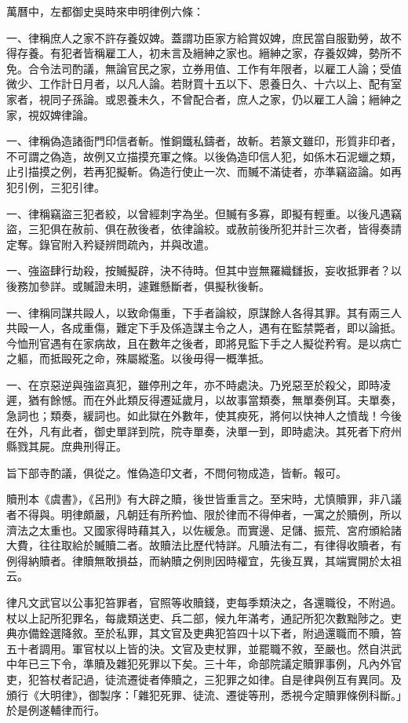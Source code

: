 萬曆中，左都御史吳時來申明律例六條：

一、律稱庶人之家不許存養奴婢。蓋謂功臣家方給賞奴婢，庶民當自服勤勞，故不得存養。有犯者皆稱雇工人，初未言及縉紳之家也。縉紳之家，存養奴婢，勢所不免。合令法司酌議，無論官民之家，立券用值、工作有年限者，以雇工人論；受值微少、工作計日月者，以凡人論。若財買十五以下、恩養日久、十六以上、配有室家者，視同子孫論。或恩養未久，不曾配合者，庶人之家，仍以雇工人論；縉紳之家，視奴婢律論。

一、律稱偽造諸衙門印信者斬。惟銅鐵私鑄者，故斬。若篆文雖印，形質非印者，不可謂之偽造，故例又立描摸充軍之條。以後偽造印信人犯，如係木石泥蠟之類，止引描摸之例，若再犯擬斬。偽造行使止一次、而贓不滿徒者，亦準竊盜論。如再犯引例，三犯引律。

一、律稱竊盜三犯者絞，以曾經刺字為坐。但贓有多寡，即擬有輕重。以後凡遇竊盜，三犯俱在赦前、俱在赦後者，依律論絞。或赦前後所犯并計三次者，皆得奏請定奪。錄官附入矜疑辨問疏內，并與改遣。

一、強盜肆行劫殺，按贓擬辟，決不待時。但其中豈無羅織讎扳，妄收抵罪者？以後務加參詳。或贓證未明，遽難懸斷者，俱擬秋後斬。

一、律稱同謀共毆人，以致命傷重，下手者論絞，原謀餘人各得其罪。其有兩三人共毆一人，各成重傷，難定下手及係造謀主令之人，遇有在監禁斃者，即以論抵。今恤刑官遇有在家病故，且在數年之後者，即將見監下手之人擬從矜宥。是以病亡之軀，而抵毆死之命，殊屬縱濫。以後毋得一概準抵。

一、在京惡逆與強盜真犯，雖停刑之年，亦不時處決。乃兇惡至於殺父，即時凌遲，猶有餘憾。而在外此類反得遷延歲月，以故事當類奏，無單奏例耳。夫單奏，急詞也；類奏，緩詞也。如此獄在外數年，使其瘐死，將何以快神人之憤哉！今後在外，凡有此者，御史單詳到院，院寺單奏，決單一到，即時處決。其死者下府州縣戮其屍。庶典刑得正。

旨下部寺酌議，俱從之。惟偽造印文者，不問何物成造，皆斬。報可。

贖刑本《虞書》，《呂刑》有大辟之贖，後世皆重言之。至宋時，尤慎贖罪，非八議者不得與。明律頗嚴，凡朝廷有所矜恤、限於律而不得伸者，一寓之於贖例，所以濟法之太重也。又國家得時藉其入，以佐緩急。而實邊、足儲、振荒、宮府頒給諸大費，往往取給於贓贖二者。故贖法比歷代特詳。凡贖法有二，有律得收贖者，有例得納贖者。律贖無敢損益，而納贖之例則因時權宜，先後互異，其端實開於太祖云。

律凡文武官以公事犯笞罪者，官照等收贖錢，吏每季類決之，各還職役，不附過。杖以上記所犯罪名，每歲類送吏、兵二部，候九年滿考，通記所犯次數黜陟之。吏典亦備銓選降敘。至於私罪，其文官及吏典犯笞四十以下者，附過還職而不贖，笞五十者調用。軍官杖以上皆的決。文官及吏杖罪，並罷職不敘，至嚴也。然自洪武中年已三下令，準贖及雜犯死罪以下矣。三十年，命部院議定贖罪事例，凡內外官吏，犯笞杖者記過，徒流遷徙者俸贖之，三犯罪之如律。自是律與例互有異同。及頒行《大明律》，御製序：「雜犯死罪、徒流、遷徙等刑，悉視今定贖罪條例科斷。」於是例遂輔律而行。

